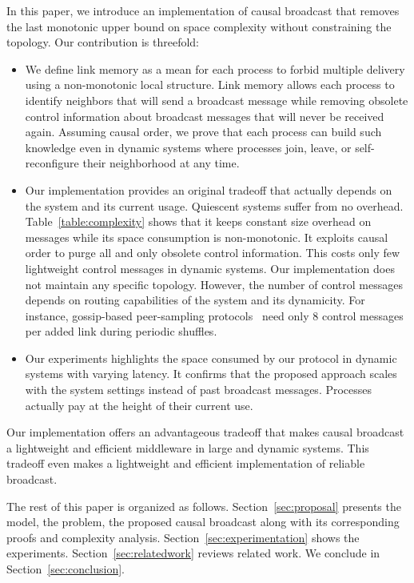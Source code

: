 In this paper, we introduce an implementation of causal broadcast that removes
the last monotonic upper bound on space complexity without constraining the
topology.  Our contribution is threefold:
\begin{itemize}[leftmargin=*]
\item We define link memory as a mean for each process to forbid multiple
  delivery using a non-monotonic local structure. Link memory allows each
  process to identify neighbors that will send a broadcast message while
  removing obsolete control information about broadcast messages that will never
  be received again. Assuming causal order, we prove that each process can build
  such knowledge even in dynamic systems where processes join, leave, or
  self-reconfigure their neighborhood at any time.
\item Our implementation provides an original tradeoff that actually depends on
  the system and its current usage. Quiescent systems suffer from no
  overhead. Table~\ref{table:complexity} shows that it keeps constant size
  overhead on messages while its space consumption is non-monotonic. It exploits
  causal order to purge all and only obsolete control information. This costs
  only few lightweight control messages in dynamic systems.  Our implementation
  does not maintain any specific topology. However, the number of control
  messages depends on routing capabilities of the system and its dynamicity. For
  instance, gossip-based peer-sampling
  protocols~\cite{jelasity2007gossip,jelasity2009tman,nedelec2017adaptive} need
  only 8 control messages per added link during periodic shuffles.
\item Our experiments highlights the space consumed by our protocol in dynamic
  systems with varying latency. It confirms that the proposed approach scales
  with the system settings instead of past broadcast messages. Processes
  actually pay at the height of their current use.
\end{itemize}
Our implementation offers an advantageous tradeoff that makes causal broadcast a
lightweight and efficient middleware in large and dynamic systems. This tradeoff
even makes a lightweight and efficient implementation of reliable broadcast.

The rest of this paper is organized as follows. 
Section~\ref{sec:proposal} presents the model, the problem, the proposed causal
broadcast along with its corresponding proofs and complexity
analysis. Section~\ref{sec:experimentation} shows the
experiments. Section~\ref{sec:relatedwork} reviews related work. We conclude in
Section~\ref{sec:conclusion}.


